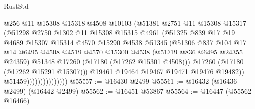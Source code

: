 \begin{lexlean}{RustStd}
\begin{coremodule}
{\begin{coremodule}
{{{{{{{{{{{{{{{{{{{{{{{{{{{{{{{{{{{{{{{{{{{{{{{{{{{{{{{                                  @256
                                  @11
                                  @15308
                                  @15318
                                  @4508
                                  @10103
                                  (@51381
                                    @2751
                                    @11
                                    @15308
                                    @15317
                                    (@51298
                                      @2750
                                      @1302
                                      @11
                                      @15308
                                      @15315
                                      @4961
                                      (@51325
                                        @839
                                        @17
                                        @19
                                        @4689
                                        @15307
                                        @15314
                                        @4570
                                        @15290
                                        @4538
                                        @51345
                                        (@51306
                                          @837
                                          @104
                                          @17
                                          @14
                                          @6495
                                          @4508
                                          @4519
                                          @4570
                                          @15300
                                          @4538
                                          (@51319 @836 @6495 @24355 @24359)
                                          @51348
                                          @17260
                                          (@17180 (@17262 @15301 @4508)))
                                        @17260
                                        (@17180 (@17262 @15291 @15307)))
                                      @19461
                                      @19464
                                      @19467
                                      @19471
                                      @19476
                                      @19482))
                                  @51459)))))))))))))))
@55557 := @16430 @2499
@55561 := @16432 (@16436 @2499) (@16442 @2499)
@55562 := @16451 @53867
@55564 := @16447 (@55562 @16466)
}}}}}}}}}}}}}}}}}}}}}}}}}}}}}}}}}}}}}}}}}}}}}}}}}}}}}}}
\end{coremodule}}
\end{coremodule}
\end{lexlean}
